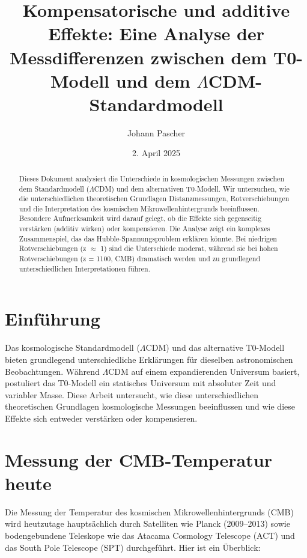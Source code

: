 \documentclass[a4paper,12pt]{article}
\theoremstyle{definition}
\theoremstyle{remark}
\begin{document}
	
	\title{Kompensatorische und additive Effekte: Eine Analyse der Messdifferenzen zwischen dem T0-Modell und dem \(\Lambda\)CDM-Standardmodell}
	\author{Johann Pascher}
	\date{2. April 2025}
	\maketitle
	
	\begin{abstract}
		Dieses Dokument analysiert die Unterschiede in kosmologischen Messungen zwischen dem Standardmodell (\(\Lambda\)CDM) und dem alternativen T0-Modell. Wir untersuchen, wie die unterschiedlichen theoretischen Grundlagen Distanzmessungen, Rotverschiebungen und die Interpretation des kosmischen Mikrowellenhintergrunds beeinflussen. Besondere Aufmerksamkeit wird darauf gelegt, ob die Effekte sich gegenseitig verstärken (additiv wirken) oder kompensieren. Die Analyse zeigt ein komplexes Zusammenspiel, das das Hubble-Spannungsproblem erklären könnte. Bei niedrigen Rotverschiebungen (z \(\approx\) 1) sind die Unterschiede moderat, während sie bei hohen Rotverschiebungen (z = 1100, CMB) dramatisch werden und zu grundlegend unterschiedlichen Interpretationen führen.
	\end{abstract}
	
	\tableofcontents
	\newpage
	
	\section{Einführung}
	
	Das kosmologische Standardmodell (\(\Lambda\)CDM) und das alternative T0-Modell bieten grundlegend unterschiedliche Erklärungen für dieselben astronomischen Beobachtungen. Während \(\Lambda\)CDM auf einem expandierenden Universum basiert, postuliert das T0-Modell ein statisches Universum mit absoluter Zeit und variabler Masse. Diese Arbeit untersucht, wie diese unterschiedlichen theoretischen Grundlagen kosmologische Messungen beeinflussen und wie diese Effekte sich entweder verstärken oder kompensieren.
	
	\section{Messung der CMB-Temperatur heute}
	
	Die Messung der Temperatur des kosmischen Mikrowellenhintergrunds (CMB) wird heutzutage hauptsächlich durch Satelliten wie Planck (2009–2013) sowie bodengebundene Teleskope wie das Atacama Cosmology Telescope (ACT) und das South Pole Telescope (SPT) durchgeführt. Hier ist ein Überblick:
	
\end{document}
